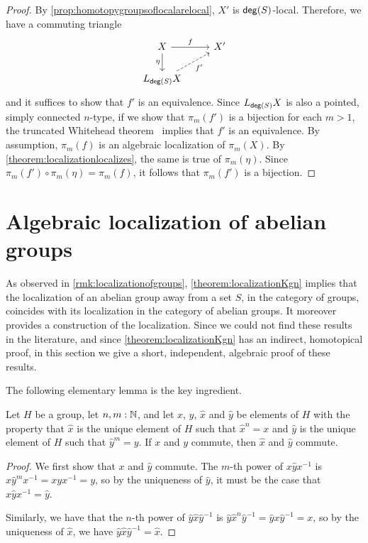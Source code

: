 \begin{proof}
  By \cref{prop:homotopygroupsoflocalarelocal}, $X'$ is $\mathsf{deg}(S)$-local.
  Therefore, we have a commuting triangle
  \[
    \begin{tikzcd}
      X \arrow[r,"f"] \arrow[d,swap,"\eta"] & X' \\
      L_{\degg(S)} X \arrow[ur,dashed,swap,"f'"]
    \end{tikzcd}
  \]
  and it suffices to show that $f'$ is an equivalence.
  Since $L_{\mathsf{deg}(S)} X$ is also a pointed, simply connected $n$-type,
  if we show that $\pi_m(f')$ is a bijection for each $m > 1$,
  the truncated Whitehead theorem~\cite[Theorem~8.8.3]{hottbook} implies
  that $f'$ is an equivalence.
  By assumption, $\pi_m(f)$ is an algebraic localization of $\pi_m(X)$.
  By \cref{theorem:localizationlocalizes}, the same is true of $\pi_m(\eta)$.
  Since $\pi_m(f') \circ \pi_m(\eta) = \pi_m(f)$, it follows that
  $\pi_m(f')$ is a bijection.
\end{proof}

\section{Algebraic localization of abelian groups}\label{ss:abelian}

As observed in \cref{rmk:localizationofgroups},
\cref{theorem:localizationKgn} implies that the localization of an abelian group
away from a set $S$, in the category of groups, coincides with its localization in
the category of abelian groups. It moreover provides a construction of the localization.
Since we could not find these results in the literature, and since \cref{theorem:localizationKgn}
has an indirect, homotopical proof, in this section we give a short, independent, algebraic proof
of these results.

The following elementary lemma is the key ingredient.
 
\begin{lem}
    Let $H$ be a group, let $n,m : \mathbb{N}$, and let $x$, $y$, $\hat{x}$ and $\hat{y}$ be
    elements of $H$ with the property that
    $\hat{x}$ is the unique element of $H$ such that $\hat{x}^n = x$ and
    $\hat{y}$ is the unique element of $H$ such that $\hat{y}^m = y$.
    If $x$ and $y$ commute, then $\hat{x}$ and $\hat{y}$ commute.
\end{lem}

\begin{proof}
    We first show that $x$ and $\hat{y}$ commute.
    The $m$-th power of $x \hat{y} x^{-1}$ is $x \hat{y}^m x^{-1} = x y x^{-1} = y$,
    so by the uniqueness of $\hat{y}$, it must be the case that $x \hat{y} x^{-1} = \hat{y}$.

    Similarly, we have that
    the $n$-th power of $\hat{y} \hat{x} \hat{y}^{-1}$ is
    $\hat{y} \hat{x}^n \hat{y}^{-1} = \hat{y} x \hat{y}^{-1} = x$,
    so by the uniqueness of $\hat{x}$, we have $\hat{y} \hat{x} \hat{y}^{-1} = \hat{x}$.
\end{proof}


